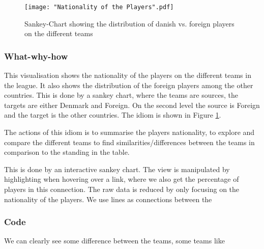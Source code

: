 \documentclass[Report.tex]{subfiles}
\begin{document}
\begin{figure}
\center
\texttt{[image: "Nationality of the Players".pdf]}
\caption{Sankey-Chart showing the distribution of danish vs. foreign players on the different teams}
\label{Fig:Nationality}
\end{figure}


\subsubsection{What-why-how}
This visualisation shows the nationality of the players on the different teams in the league. It also shows the distribution of the foreign players among the other countries. This is done by a sankey chart, where the teams are sources, the targets are either Denmark and Foreign. On the second level the source is Foreign and the target is the other countries. The idiom is shown in Figure \ref{Fig:Nationality}.

The actions of this idiom is to summarise the players nationality, to explore and compare the different teams to find similarities/differences between the teams in comparison to the standing in the table. 

This is done by an interactive sankey chart. The view is manipulated by highlighting when hovering over a link, where we also get the percentage of players in this connection. The raw data is reduced by only focusing on the nationality of the players. We use lines as connections between the 

\subsubsection{Code}



We can clearly see some difference between the teams, some teams like 
\end{document}
